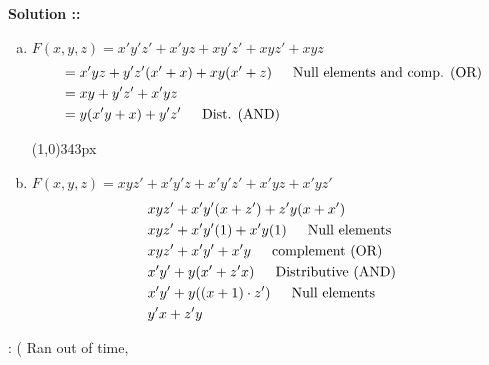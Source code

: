 \documentclass[11pt]{article}
\begin{document}
\vspace{5px}\textbf{Solution ::}
\begin{enumerate}[a)]
    \item 
    $F(x,y,z) = x'y'z' + x'yz + xy'z' + xyz' + xyz$
    \begin{align*}
        &= x'yz + y'z'(x'+x)+xy(x'+z) \text{\hspace{15pt}Null elements and comp.
        (OR)}\\
        &= xy + y'z' + x'yz \\
        &= y(x'y + x) + y'z' \text{\hspace{15pt}Dist. (AND)}
    \end{align*}

    \line(1,0){343px}
    \item 
    $F(x,y,z)=  xyz' + x'y'z + x'y'z' + x'yz + x'yz'$
    \begin{align*}
        & xyz' + x'y'(x+z')+z'y(x+x') \\
        & xyz' + x'y'(1) + x'y(1) \text{\hspace{15pt}Null elements} \\
        & xyz' + x'y' + x'y \text{\hspace{15pt}complement (OR)}\\
        &x'y' + y(x' + z'x) \text{\hspace{15pt}Distributive (AND)}\\
        & x'y' + y((x+1)\cdot z') \text{\hspace{15pt}Null elements}\\
        & y'x  + z'y
    \end{align*}
\end{enumerate}
\vspace{200pt}: ( Ran out of time, 
\end{document}
